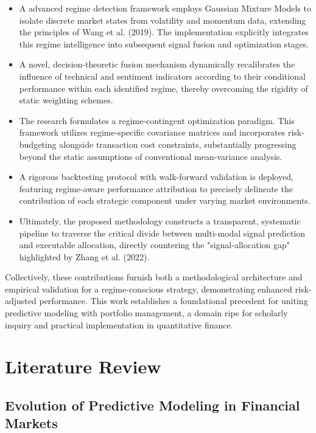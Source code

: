 \documentclass{singlecol-new}
\theoremstyle{TH}{
\newtheorem{lemma}{Lemma}
\newtheorem{theorem}[lemma]{Theorem}
\newtheorem{corrolary}[lemma]{Corrolary}
\newtheorem{conjecture}[lemma]{Conjecture}
\newtheorem{proposition}[lemma]{Proposition}
\newtheorem{claim}[lemma]{Claim}
\newtheorem{stheorem}[lemma]{Wrong Theorem}
\newtheorem{algorithm}{Algorithm}
}
\theoremstyle{THrm}{
\newtheorem{definition}{Definition}[section]
\newtheorem{question}{Question}[section]
\newtheorem{remark}{Remark}
\newtheorem{scheme}{Scheme}
}
\theoremstyle{THhit}{
\newtheorem{case}{Case}[section]
}
\begin{document}
\begin{itemize}

\item A advanced regime detection framework employs Gaussian Mixture Models to isolate discrete market states from volatility and momentum data, extending the principles of Wang et al. (2019). The implementation explicitly integrates this regime intelligence into subsequent signal fusion and optimization stages.

\item A novel, decision-theoretic fusion mechanism dynamically recalibrates the influence of technical and sentiment indicators according to their conditional performance within each identified regime, thereby overcoming the rigidity of static weighting schemes.

\item The research formulates a regime-contingent optimization paradigm. This framework utilizes regime-specific covariance matrices and incorporates risk-budgeting alongside transaction cost constraints, substantially progressing beyond the static assumptions of conventional mean-variance analysis.

\item A rigorous backtesting protocol with walk-forward validation is deployed, featuring regime-aware performance attribution to precisely delineate the contribution of each strategic component under varying market environments.

\item Ultimately, the proposed methodology constructs a transparent, systematic pipeline to traverse the critical divide between multi-modal signal prediction and executable allocation, directly countering the "signal-allocation gap" highlighted by Zhang et al. (2022).
\end{itemize}


Collectively, these contributions furnish both a methodological architecture and empirical validation for a regime-conscious strategy, demonstrating enhanced risk-adjusted performance. This work establishes a foundational precedent for uniting predictive modeling with portfolio management, a domain ripe for scholarly inquiry and practical implementation in quantitative finance.



\section{Literature Review} 
\subsection{Evolution of Predictive Modeling in Financial Markets}
\end{document}
